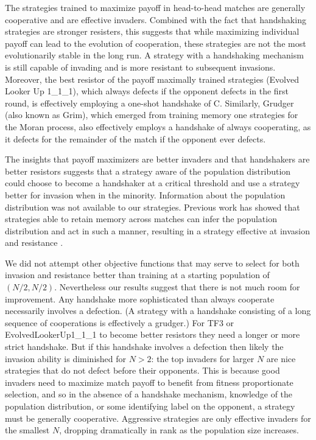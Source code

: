 \documentclass[10pt,journal]{IEEEtran}
\begin{document}
The strategies trained to maximize payoff in head-to-head matches are generally
cooperative and are effective invaders.
Combined with the fact that handshaking strategies are stronger resisters,
this suggests that while maximizing individual payoff can lead to the evolution
of cooperation, these strategies are not the most evolutionarily stable
in the long run. A strategy with a handshaking mechanism is still capable of
invading and is more resistant to subsequent invasions. Moreover, the
best resistor of the payoff maximally trained strategies (Evolved Looker Up
1\_1\_1),
which always defects if the opponent defects in the first round, is effectively
employing a one-shot handshake of C. Similarly, Grudger (also known as Grim),
which emerged from training memory one strategies for the Moran process,
also effectively employs a handshake of always cooperating, as it defects
for the remainder of the match if the opponent ever defects.

The insights that payoff maximizers are better invaders and that handshakers
are better resistors suggests that a strategy
aware of the population distribution could choose to become a handshaker at
a critical threshold and use a strategy better for invasion when in the
minority. Information about the population distribution was not available
to our strategies. Previous work has showed that strategies able to retain
memory across matches can infer the population distribution and act in such
a manner, resulting in a strategy effective at invasion and resistance
\cite{Lee2015}.

We did not attempt other objective functions that may serve to select for both
invasion and resistance better than training at a starting population of
$(N/2, N/2)$. Nevertheless our results suggest that there is not much room for
improvement. Any handshake more sophisticated than always cooperate necessarily involves
a defection. (A strategy with a handshake consisting of a long sequence of cooperations is
effectively a grudger.) For TF3 or EvolvedLookerUp1\_1\_1 to become better resistors
they need a longer or more strict handshake. But if this handshake involves
a defection then likely the invasion ability is diminished for $N > 2$: the top
invaders for larger $N$ are nice strategies that do not defect before their
opponents. This is because good invaders need to maximize match payoff to benefit
from fitness proportionate selection,
and so in the absence of a handshake mechanism, knowledge of the population
distribution, or some identifying label on the opponent,
a strategy must be generally cooperative. Aggressive strategies
are only effective invaders for the smallest $N$, dropping dramatically in rank
as the population size increases.
\end{document}
